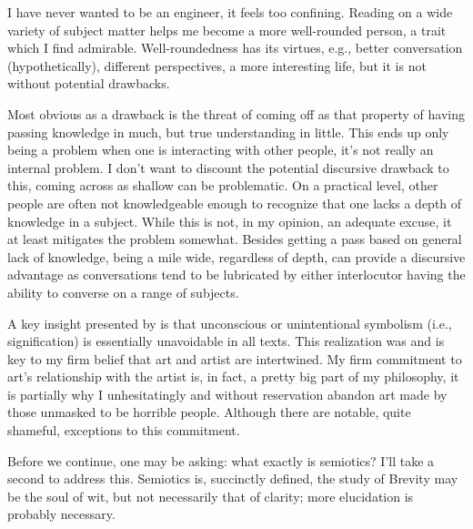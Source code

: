 \documentclass[../butidigress.tex]{subfiles}
\begin{document}
I have never wanted to be  an engineer, it feels too confining.
Reading on a wide variety of subject matter helps me become a more well-rounded person, a trait which I find admirable.
Well-roundedness has its virtues, e.g., better conversation (hypothetically), different perspectives, a more interesting life, but it is not without potential drawbacks.

Most obvious as a drawback is the threat of coming off as  that property of having passing knowledge in much, but true understanding in little.
This ends up only being a problem when one is interacting with other people, it's not really an internal problem.
I don't want to discount the potential discursive drawback to this, coming across as shallow can be problematic.
On a practical level, other people are often not knowledgeable enough to recognize that one lacks a depth of knowledge in a subject.
While this is not, in my opinion, an adequate excuse, it at least mitigates the problem somewhat.
Besides getting a pass based on general lack of knowledge, being a mile wide, regardless of depth, can provide a discursive advantage as conversations tend to be lubricated by either interlocutor having the ability to converse on a range of subjects.

A key insight presented by  is that unconscious or unintentional symbolism (i.e., signification) is essentially unavoidable in all texts.
This realization was and is key to my firm belief that art and artist are intertwined.
My firm commitment to art's relationship with the artist is, in fact, a pretty big part of my philosophy, it is partially why I unhesitatingly and without reservation abandon art made by those unmasked to be horrible people.
Although there are notable, quite shameful, exceptions to this commitment.

Before we continue, one may be asking: what exactly is semiotics? I'll take a second to address this.
Semiotics is, succinctly defined, the study of 
Brevity may be the soul of wit, but not necessarily that of clarity; more elucidation is probably necessary.
\end{document}
